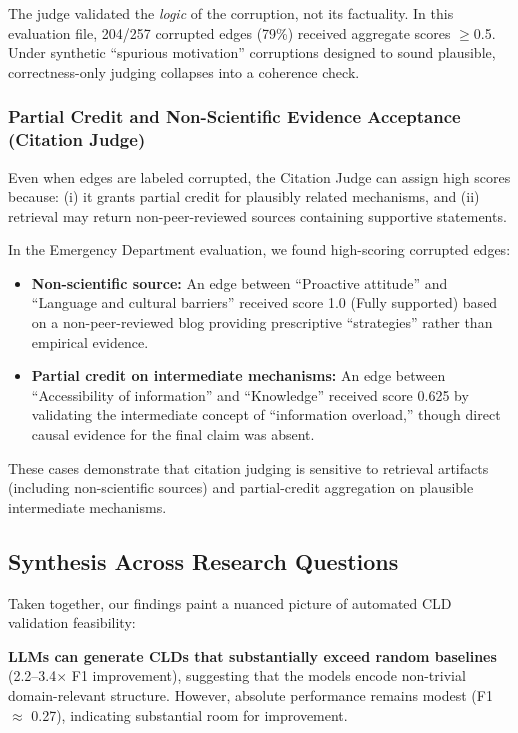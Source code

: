 The judge validated the \textit{logic} of the corruption, not its factuality. In this evaluation file, 204/257 corrupted edges (79\%) received aggregate scores $\geq$0.5. Under synthetic ``spurious motivation'' corruptions designed to sound plausible, correctness-only judging collapses into a coherence check.

\subsubsection{Partial Credit and Non-Scientific Evidence Acceptance (Citation Judge)}

Even when edges are labeled corrupted, the Citation Judge can assign high scores because: (i) it grants partial credit for plausibly related mechanisms, and (ii) retrieval may return non-peer-reviewed sources containing supportive statements.

In the Emergency Department evaluation, we found high-scoring corrupted edges:
\begin{itemize}[noitemsep]
    \item \textbf{Non-scientific source:} An edge between ``Proactive attitude'' and ``Language and cultural barriers'' received score 1.0 (Fully supported) based on a non-peer-reviewed blog providing prescriptive ``strategies'' rather than empirical evidence.
    \item \textbf{Partial credit on intermediate mechanisms:} An edge between ``Accessibility of information'' and ``Knowledge'' received score 0.625 by validating the intermediate concept of ``information overload,'' though direct causal evidence for the final claim was absent.
\end{itemize}

These cases demonstrate that citation judging is sensitive to retrieval artifacts (including non-scientific sources) and partial-credit aggregation on plausible intermediate mechanisms.

\subsection{Synthesis Across Research Questions}
\label{sec:discussion_synthesis}

Taken together, our findings paint a nuanced picture of automated CLD validation feasibility:

\textbf{LLMs can generate CLDs that substantially exceed random baselines} (2.2--3.4$\times$ F1 improvement), suggesting that the models encode non-trivial domain-relevant structure. However, absolute performance remains modest (F1 $\approx$ 0.27), indicating substantial room for improvement.

